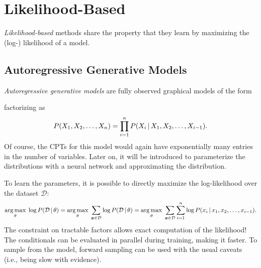 	\section{Likelihood-Based}
		\emph{Likelihood-based} methods share the property that they learn by maximizing the (log-) likelihood of a model.

		\subsection{Autoregressive Generative Models}
			\emph{Autoregressive generative models} are fully observed graphical models of the form
			\begin{center}
			\end{center}
			factorizing as
			\begin{equation}
				P(X_1, X_2, \dots, X_n) = \prod_{i = 1}^{n} P(X_i \,\vert\, X_1, X_2, \dots, X_{i - 1}).
			\end{equation}
			Of course, the CPTs for this model would again have exponentially many entries in the number of variables. Later on, it will be introduced to parameterize the distributions with a neural network and approximating the distribution.

			To learn the parameters, it is possible to directly maximize the log-likelihood over the dataset \(\mathcal{D}\):
			\begin{equation}
				\operatorname*{arg\,max}_\theta \; \log P(\mathcal{D} \,\vert\, \theta)
					= \operatorname*{arg\,max}_\theta \; \sum_{\bm{x} \in \mathcal{D}} \log P(\mathcal{D} \,\vert\, \theta)
					= \operatorname*{arg\,max}_\theta \; \sum_{\bm{x} \in \mathcal{D}} \sum_{i = 1}^{n} \log P(x_i \,\vert\, x_1, x_2, \dots, x_{i - 1}).
			\end{equation}
			The constraint on tractable factors allows exact computation of the likelihood! The conditionals can be evaluated in parallel during training, making it faster. To sample from the model, forward sampling can be used with the usual caveats (i.e., being slow with evidence).

